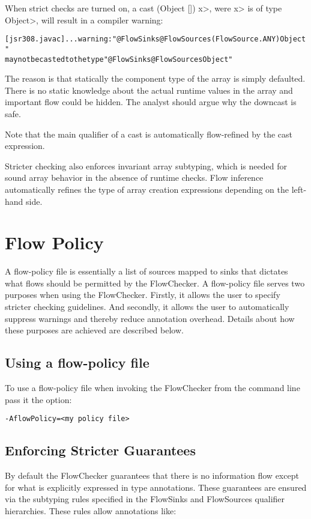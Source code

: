 When strict checks are turned on,
a cast \<(Object []) x>, were \<x> is of type \<Object>, will result
in a compiler warning:

\begin{alltt}
[jsr308.javac] ... warning: "@FlowSinks @FlowSources({FlowSource.ANY}) Object"
       may not be casted to the type "@FlowSinks @FlowSources Object"
\end{alltt}

The reason is that statically the component type of the array is
simply defaulted. There is no static knowledge about the actual
runtime values in the array and important flow could be hidden.
The analyst should argue why the downcast is safe.

Note that the main qualifier of a cast is automatically flow-refined
by the cast expression.


\medskip

Stricter checking also enforces invariant array subtyping, which is
needed for sound array behavior in the absence of runtime checks.
Flow inference automatically refines the type of array creation
expressions depending on the left-hand side.

\section{Flow Policy}

A flow-policy file is essentially a list of sources mapped to sinks
that dictates what flows should be permitted by the FlowChecker.  A
flow-policy file serves two purposes when using the FlowChecker.
Firstly, it allows the user to specify stricter checking guidelines.
And secondly, it allows the user to automatically suppress warnings
and thereby reduce annotation overhead.  Details about how these
purposes are achieved are described below.

\subsection{Using a flow-policy file}
To use a flow-policy file when invoking the FlowChecker from the
command line pass it the option:
\begin{Verbatim}
-AflowPolicy=<my policy file>
\end{Verbatim}

\subsection{Enforcing Stricter Guarantees}
By default the FlowChecker guarantees that there is no information
flow except for what is explicitly expressed in type annotations.
These guarantees are ensured via the subtyping rules specified
in the FlowSinks and FlowSources qualifier hierarchies.
These rules allow annotations like:

